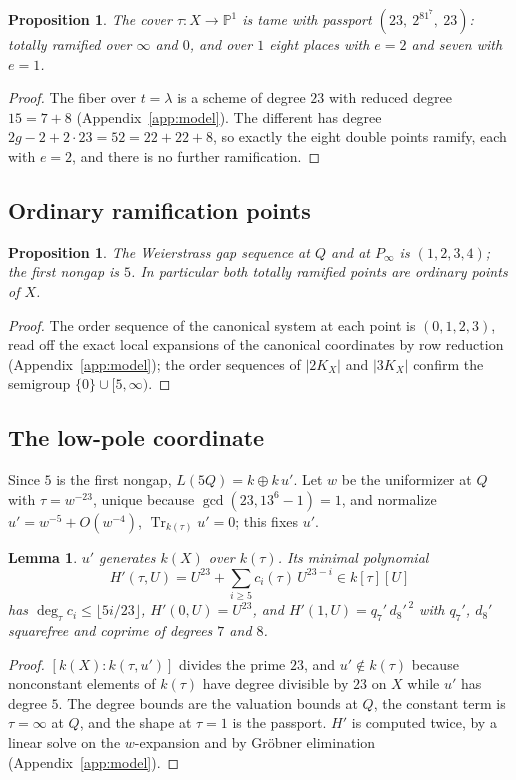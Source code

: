 \documentclass[11pt]{amsart}
\newcommand{\PP}{\mathbb{P}}
\newcommand{\Tr}{\operatorname{Tr}}
\theoremstyle{plain}
\newtheorem{proposition}[theorem]{Proposition}
\newtheorem{lemma}[theorem]{Lemma}
\theoremstyle{definition}
\begin{document}
\begin{proposition}\label{prop:passport}
The cover $\tau\colon X\to\PP^1$ is tame with passport
$(23,\ 2^81^7,\ 23)$: totally ramified over $\infty$ and $0$, and over
$1$ eight places with $e=2$ and seven with $e=1$.
\end{proposition}
\begin{proof}
The fiber over $t=\lambda$ is a scheme of degree $23$ with reduced
degree $15=7+8$ (Appendix~\ref{app:model}). The different has degree
$2g-2+2\cdot23=52=22+22+8$, so exactly the eight double points ramify,
each with $e=2$, and there is no further ramification.
\end{proof}

\subsection{Ordinary ramification points}

\begin{proposition}\label{prop:gaps}
The Weierstrass gap sequence at $Q$ and at $P_\infty$ is $(1,2,3,4)$;
the first nongap is $5$. In particular both totally ramified points are
ordinary points of $X$.
\end{proposition}
\begin{proof}
The order sequence of the canonical system at each point is
$(0,1,2,3)$, read off the exact local expansions of the canonical
coordinates by row reduction (Appendix~\ref{app:model}); the order
sequences of $|2K_X|$ and $|3K_X|$ confirm the semigroup
$\{0\}\cup[5,\infty)$.
\end{proof}

\subsection{The low-pole coordinate}

Since $5$ is the first nongap, $L(5Q)=k\oplus k\,u'$. Let $w$ be the
uniformizer at $Q$ with $\tau=w^{-23}$, unique because
$\gcd(23,13^6-1)=1$, and normalize $u'=w^{-5}+O(w^{-4})$,
$\Tr_{k(\tau)}u'=0$; this fixes $u'$.

\begin{lemma}\label{lem:hprime}
$u'$ generates $k(X)$ over $k(\tau)$. Its minimal polynomial
\[
  H'(\tau,U)=U^{23}+\sum_{i\ge5}c_i(\tau)\,U^{23-i}\in k[\tau][U]
\]
has $\deg_\tau c_i\le\lfloor5i/23\rfloor$, $H'(0,U)=U^{23}$, and
$H'(1,U)=q_7'\,d_8'^{\,2}$ with $q_7'$, $d_8'$ squarefree and coprime
of degrees $7$ and $8$.
\end{lemma}
\begin{proof}
$[k(X):k(\tau,u')]$ divides the prime $23$, and $u'\notin k(\tau)$
because nonconstant elements of $k(\tau)$ have degree divisible by
$23$ on $X$ while $u'$ has degree $5$. The degree bounds are the
valuation bounds at $Q$, the constant term is $\tau=\infty$ at $Q$,
and the shape at $\tau=1$ is the passport. $H'$ is computed twice,
by a linear solve on the $w$-expansion and by Gr\"obner elimination
(Appendix~\ref{app:model}).
\end{proof}
\end{document}
